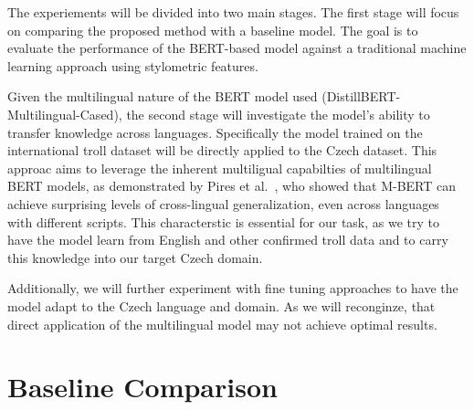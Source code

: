\documentclass[twoside]{ctuthesis}
\theoremstyle{plain}
\theoremstyle{definition}
\theoremstyle{note}
\begin{document}
The experiements will be divided into two main stages. The first stage will focus on comparing the proposed method with a baseline model. The goal is to evaluate the performance of the BERT-based model against a traditional machine learning approach using stylometric features.\par
Given the multilingual nature of the BERT model used (DistillBERT-Multilingual-Cased), the second stage will investigate the model's ability to transfer knowledge across languages. Specifically the model trained on the international troll dataset will be directly applied to the Czech dataset. This approac aims to leverage the inherent multiligual capabilties of multilingual BERT models, as demonstrated by Pires et al.~\cite{Pires2019}, who showed that M-BERT can achieve surprising levels of cross-lingual generalization, even across languages with different scripts. This characterstic is essential for our task, as we try to have the model learn from English and other confirmed troll data and to carry this knowledge into our target Czech domain.\par
Additionally, we will further experiment with fine tuning approaches to have the model adapt to the Czech language and domain. As we will reconginze, that direct application of the multilingual model may not achieve optimal results.\par


\section{Baseline Comparison}
\end{document}
